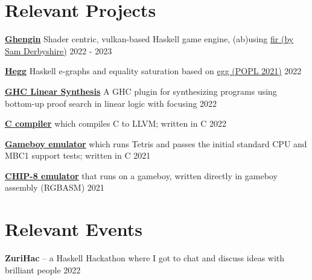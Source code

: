 \documentclass{article}
\newlength{\spacebox}
\newcommand{\skill}[2]{
\noindent\hangindent=2em\hangafter=0
\parbox{3\spacebox}{ \textsc{#1}} #2 \par}
\newcommand{\lientry}[3]{
\small
  \noindent \textbf{#1} #2 \hfill #3
\normalsize
}
\begin{document}
\section*{Relevant Projects}

  \lientry
    {\href{https://github.com/alt-romes/ghengin}{Ghengin}}
    {Shader centric, vulkan-based Haskell game engine, (ab)using
    \href{https://gitlab.com/sheaf/fir}{fir (by Sam Derbyshire)}}
    {2022 - 2023}

  \lientry
    {\href{https://github.com/alt-romes/hegg}{Hegg}}
    {Haskell e-graphs and equality saturation based on
    \href{https://dl.acm.org/doi/10.1145/3434304}{egg (POPL 2021)}}
    {2022}

  \lientry
    {\href{https://github.com/alt-romes/ghc-linear-synthesis-plugin}{GHC Linear Synthesis}}
    {A GHC plugin for synthesizing programs using bottom-up proof search in
    linear logic with focusing}
    {2022}

  \lientry
    {\href{https://github.com/alt-romes/c-compiler}{C compiler}}
    {which compiles C to LLVM; written in C}
    {2022}



  \lientry
    {\href{https://github.com/alt-romes/gameboyemulator}{Gameboy emulator}}
    {which runs Tetris and passes the initial standard CPU and MBC1
    support tests; written in C}
    {2021}

  \lientry
    {\href{https://github.com/alt-romes/chip8-emulator-for-gameboy}{CHIP-8 emulator}}
    {that runs on a gameboy, written directly in gameboy assembly (RGBASM)}
    {2021}

\section*{Relevant Events}

  \lientry
    {ZuriHac}
    {-- a Haskell Hackathon where I got to chat and discuss ideas with brilliant
    people}
    {2022}




\end{document}
